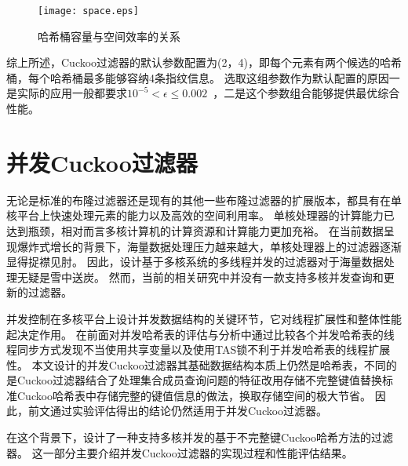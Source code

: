\begin{figure}[htbp]
\centering
\texttt{[image: space.eps]}
\caption{哈希桶容量与空间效率的关系}
\label{fig:cbf_space}
\end{figure}

综上所述，Cuckoo过滤器的默认参数配置为(2，4)，即每个元素有两个候选的哈希桶，每个哈希桶最多能够容纳4条指纹信息。
选取这组参数作为默认配置的原因一是实际的应用一般都要求$ 10^{-5} < \epsilon \leq 0.002$~\cite{broder2004network}，二是这个参数组合能够提供最优综合性能。

\section{并发Cuckoo过滤器}
无论是标准的布隆过滤器还是现有的其他一些布隆过滤器的扩展版本，都具有在单核平台上快速处理元素的能力以及高效的空间利用率。
单核处理器的计算能力已达到瓶颈，相对而言多核计算机的计算资源和计算能力更加充裕。
在当前数据呈现爆炸式增长的背景下，海量数据处理压力越来越大，单核处理器上的过滤器逐渐显得捉襟见肘。
因此，设计基于多核系统的多线程并发的过滤器对于海量数据处理无疑是雪中送炭。
然而，当前的相关研究中并没有一款支持多核并发查询和更新的过滤器。

并发控制在多核平台上设计并发数据结构的关键环节，它对线程扩展性和整体性能起决定作用。
在前面对并发哈希表的评估与分析中通过比较各个并发哈希表的线程同步方式发现不当使用共享变量以及使用TAS锁不利于并发哈希表的线程扩展性。
本文设计的并发Cuckoo过滤器其基础数据结构本质上仍然是哈希表，不同的是Cuckoo过滤器结合了处理集合成员查询问题的特征改用存储不完整键值替换标准Cuckoo哈希表中存储完整的键值信息的做法，换取存储空间的极大节省。
因此，前文通过实验评估得出的结论仍然适用于并发Cuckoo过滤器。

在这个背景下，设计了一种支持多核并发的基于不完整键Cuckoo哈希方法的过滤器。
这一部分主要介绍并发Cuckoo过滤器的实现过程和性能评估结果。

